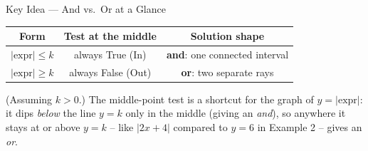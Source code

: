 \documentclass[11pt]{article}
\begin{document}
\vspace{6pt}
\begin{stepbox}{Key Idea --- And vs.\ Or at a Glance}
\begin{center}
\renewcommand{\arraystretch}{1.3}
\begin{tabular}{|c|c|c|}
\hline
\textbf{Form} & \textbf{Test at the middle} & \textbf{Solution shape}\\\hline
$\lvert \text{expr}\rvert \le k$ & always True (In) & \textbf{and}: one connected interval\\\hline
$\lvert \text{expr}\rvert \ge k$ & always False (Out) & \textbf{or}: two separate rays\\\hline
\end{tabular}
\end{center}
(Assuming $k>0$.) The middle-point test is a shortcut for the graph of $y=\lvert\text{expr}\rvert$: it
dips \emph{below} the line $y=k$ only in the middle (giving an \emph{and}), so anywhere it stays at or
above $y=k$ -- like $\lvert 2x+4\rvert$ compared to $y=6$ in Example 2 -- gives an \emph{or}.
\end{stepbox}
\end{document}
